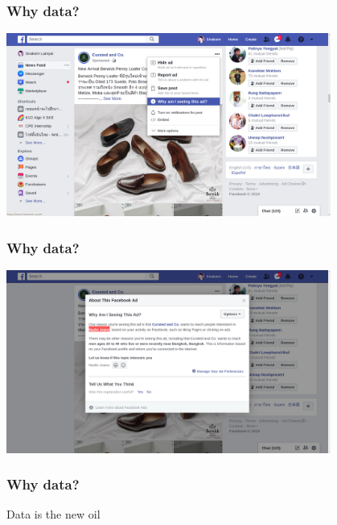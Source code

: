 \documentclass[aspectratio=169]{beamer}
\begin{document}
\begin{frame}
    \frametitle{Why data?}
    \centering
    \includegraphics[width=0.8\textwidth]{images/facebook-ads-why-am-i-seeing.png}
\end{frame}

\begin{frame}
    \frametitle{Why data?}
    \centering
    \includegraphics[width=0.8\textwidth]{images/facebook-ads-details.png}
\end{frame}

\begin{frame}
    \frametitle{Why data?}
    \centering
    \Huge Data is the new oil
\end{frame}
\end{document}
